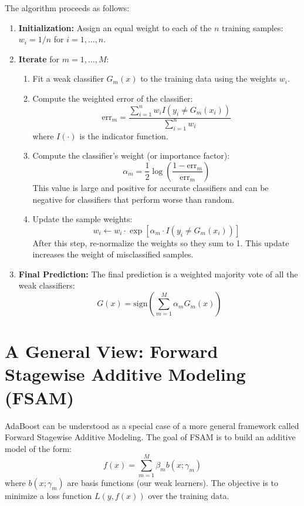\documentclass{article}
\begin{document}
\begin{multicols}{2}
	The algorithm proceeds as follows:
	\begin{enumerate}
		\item \textbf{Initialization:} Assign an equal weight to each of the $n$ training samples: $w_i = 1/n$ for $i=1, \dots, n$.
		\item \textbf{Iterate} for $m = 1, \dots, M$:
		      \begin{enumerate}
			      \item Fit a weak classifier $G_m(x)$ to the training data using the weights $w_i$.
			      \item Compute the weighted error of the classifier:
			            $$ \text{err}_m = \frac{\sum_{i=1}^{n} w_i I(y_i \neq G_m(x_i))}{\sum_{i=1}^{n} w_i} $$
			            where $I(\cdot)$ is the indicator function.
			      \item Compute the classifier's weight (or importance factor):
			            $$ \alpha_m = \frac{1}{2}\log\left(\frac{1 - \text{err}_m}{\text{err}_m}\right) $$
			            This value is large and positive for accurate classifiers and can be negative for classifiers that perform worse than random.
			      \item Update the sample weights:
			            $$ w_i \leftarrow w_i \cdot \exp[\alpha_m \cdot I(y_i \neq G_m(x_i))] $$
			            After this step, re-normalize the weights so they sum to 1. This update increases the weight of misclassified samples.
		      \end{enumerate}
		\item \textbf{Final Prediction:} The final prediction is a weighted majority vote of all the weak classifiers:
		      $$ G(x) = \text{sign}\left(\sum_{m=1}^{M} \alpha_m G_m(x)\right) $$
	\end{enumerate}

	\section{A General View: Forward Stagewise Additive Modeling (FSAM)}
	AdaBoost can be understood as a special case of a more general framework called Forward Stagewise Additive Modeling. The goal of FSAM is to build an additive model of the form:
	$$ f(x) = \sum_{m=1}^{M} \beta_m b(x; \gamma_m) $$
	where $b(x; \gamma_m)$ are basis functions (our weak learners). The objective is to minimize a loss function $L(y, f(x))$ over the training data.


\end{multicols}
\end{document}
